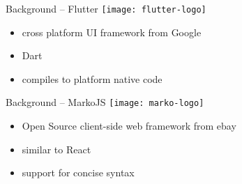 \begin{frame}{Background -- Flutter}
  \texttt{[image: flutter-logo]}

  \vspace*{2em}

  \begin{itemize}
    \item cross platform UI framework from Google
    \item Dart
    \item compiles to platform native code
  \end{itemize}
\end{frame}

\begin{frame}{Background -- MarkoJS}
  \texttt{[image: marko-logo]}

  \vspace*{2em}

  \begin{itemize}
    \item Open Source client-side web framework from ebay
    \item similar to React
    \item support for concise syntax
  \end{itemize}
\end{frame}
